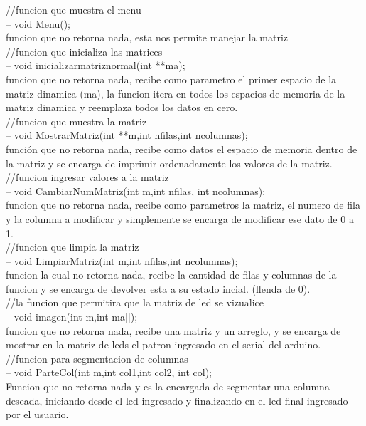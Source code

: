 \documentclass{article}
\begin{document}
//funcion que muestra el menu\\
-- void Menu();\\
funcion que no retorna nada, esta nos permite manejar la matriz\\

//funcion que inicializa las matrices\\
-- void inicializarmatriznormal(int **ma);\\
funcion que no retorna nada, recibe como parametro el primer espacio de la matriz dinamica (ma), la funcion itera en todos los espacios de memoria de la matriz dinamica y reemplaza todos los datos en cero. \\


//funcion que muestra la matriz\\
--  void MostrarMatriz(int **m,int nfilas,int ncolumnas);\\
función que no retorna nada, recibe como datos el espacio de memoria dentro de la matriz y se encarga de imprimir ordenadamente los valores de la matriz. \\

//funcion ingresar valores a la matriz \\
--  void CambiarNumMatriz(int m,int nfilas, int ncolumnas); \\
funcion que no retorna nada, recibe como parametros la matriz, el numero de fila y la columna a modificar y simplemente se encarga de modificar ese dato de 0 a 1. \\

//funcion que limpia la matriz \\
-- void LimpiarMatriz(int m,int nfilas,int ncolumnas); \\
funcion la cual no retorna nada, recibe la cantidad de filas y columnas de la funcion y se encarga de devolver esta a su estado incial. (llenda de 0). \\

//la funcion que permitira que la matriz de led se vizualice \\
-- void imagen(int m,int ma[]); \\
funcion que no retorna nada, recibe una matriz y un arreglo, y se encarga de mostrar en la matriz de leds el patron ingresado en el serial del arduino. \\

//funcion para segmentacion de columnas \\
-- void ParteCol(int m,int col1,int col2, int col); \\
Funcion que no retorna nada y es la encargada de segmentar una columna deseada, iniciando desde el led ingresado y finalizando en el led final ingresado por el usuario. \\
\end{document}
